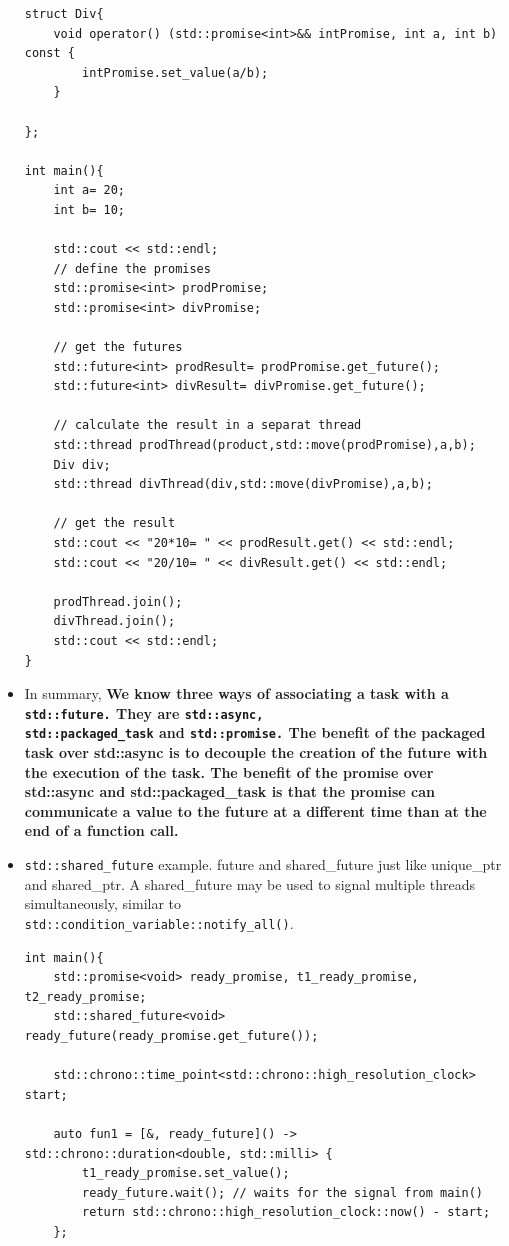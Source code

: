 \documentclass[a4paper,11pt,twoside]{book}
\begin{document}
\begin{itemize}
\begin{lstlisting}[numbers=none]
struct Div{	
	void operator() (std::promise<int>&& intPromise, int a, int b) const {
		intPromise.set_value(a/b);
	}
	
};

int main(){	
	int a= 20;
	int b= 10;
	
	std::cout << std::endl;
	// define the promises
	std::promise<int> prodPromise;
	std::promise<int> divPromise;
	
	// get the futures
	std::future<int> prodResult= prodPromise.get_future();
	std::future<int> divResult= divPromise.get_future();
	
	// calculate the result in a separat thread
	std::thread prodThread(product,std::move(prodPromise),a,b);
	Div div;
	std::thread divThread(div,std::move(divPromise),a,b);
	
	// get the result
	std::cout << "20*10= " << prodResult.get() << std::endl;
	std::cout << "20/10= " << divResult.get() << std::endl;
	
	prodThread.join();	
	divThread.join();
	std::cout << std::endl;	
}	
\end{lstlisting}

    \item In summary, \textbf{We know three ways of associating a task with a \texttt{std::future.} They are \texttt{std::async,} \\ \texttt{std::packaged\_task} and \texttt{std::promise.} The benefit of the packaged task over std::async is to decouple the creation of the future with the execution of the task. The benefit of the promise over std::async and std::packaged\_task is that the promise can communicate a value to the future at a different time than at the end of a function call. }
    
    \item \texttt{std::shared\_future} example. future and shared\_future just like unique\_ptr and shared\_ptr. A shared\_future may be used to signal multiple threads simultaneously, similar to \\
\texttt{std::condition\_variable::notify\_all()}.

\begin{lstlisting}[numbers=none]
int main(){   
	std::promise<void> ready_promise, t1_ready_promise, t2_ready_promise;
	std::shared_future<void> ready_future(ready_promise.get_future());
	
	std::chrono::time_point<std::chrono::high_resolution_clock> start;
	
	auto fun1 = [&, ready_future]() -> std::chrono::duration<double, std::milli> {
		t1_ready_promise.set_value();
		ready_future.wait(); // waits for the signal from main()
		return std::chrono::high_resolution_clock::now() - start;
	};
	

\end{lstlisting}
\end{itemize}
\end{document}
